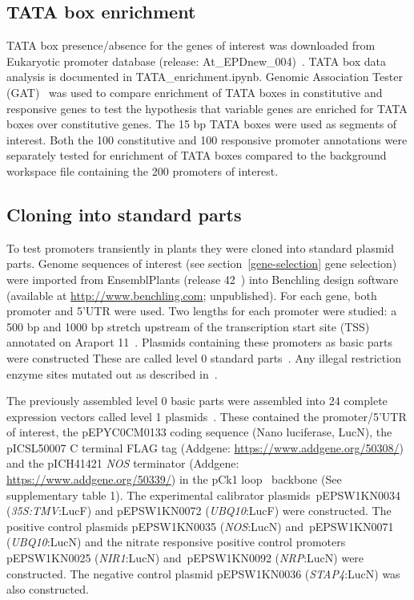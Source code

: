 \subsection{TATA box enrichment}
\label{tata-box-enrichment}

TATA box presence/absence for the genes of interest was downloaded from
Eukaryotic promoter database (release: At\_EPDnew\_004)~\autocite{dreosEukaryoticPromoterDatabase2017}. TATA box data analysis is documented in TATA\_enrichment.ipynb. Genomic Association Tester (GAT)~\autocite{hegerGATSimulationFramework2013} was used to
compare enrichment of TATA boxes in constitutive and responsive genes to test the hypothesis that variable genes are enriched for TATA boxes over constitutive genes.
The 15 bp TATA boxes were used as segments of interest. Both the 100 constitutive and 100 responsive promoter annotations were separately tested for enrichment of TATA boxes compared to the background workspace file containing the 200 promoters of interest.

\subsection{Cloning into standard parts}
\label{cloning-into-standard-parts}

To test promoters transiently in plants they were cloned into standard plasmid parts. Genome sequences of interest (see section~{\ref{gene-selection}} gene selection) were imported
from EnsemblPlants (release 42~\autocite{kerseyEnsemblGenomes20182018}) into Benchling design software (available at \url{http://www.benchling.com}; unpublished). For each gene, both promoter and 5'UTR were used. Two lengths for each promoter were studied: a 500 bp and 1000 bp stretch upstream of the transcription start site (TSS) annotated on Araport 11~\autocite{chengAraport11CompleteReannotation2017}.
Plasmids containing these promoters as basic parts were constructed These are called level 0 standard parts~\autocite{marillonnetSyntheticDNAAssembly2020}.
Any illegal restriction enzyme sites mutated out as described in~\textcite*{patronStandardsPlantSynthetic2015}.

The previously assembled level 0 basic parts were assembled into 24 complete expression vectors called level 1 plasmids~\autocite{marillonnetSyntheticDNAAssembly2020}.
These contained the promoter/5'UTR of interest, the pEPYC0CM0133 coding sequence (Nano luciferase, LucN), the pICSL50007 C terminal FLAG tag (Addgene: \url{https://www.addgene.org/50308/}) and the pICH41421 \textit{NOS} terminator (Addgene: \url{https://www.addgene.org/50339/}) in the pCk1 loop~\autocite{pollakLoopAssemblySimple2018} backbone (See supplementary table 1).
The experimental calibrator plasmids~pEPSW1KN0034 (\textit{35S:TMV}:LucF) and pEPSW1KN0072 (\textit{UBQ10}:LucF) were constructed.
The positive control plasmids pEPSW1KN0035 (\textit{NOS}:LucN) and~pEPSW1KN0071 (\textit{UBQ10}:LucN) and the nitrate responsive positive control promoters pEPSW1KN0025 (\textit{NIR1}:LucN) and~pEPSW1KN0092 (\textit{NRP}:LucN) were constructed.
The negative control plasmid pEPSW1KN0036 (\textit{STAP4}:LucN) was also constructed.

